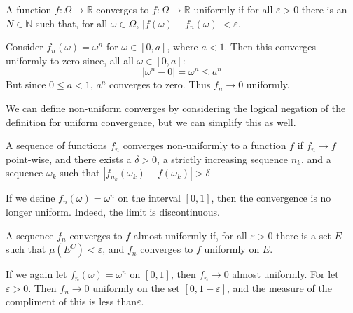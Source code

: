 \documentclass[crop=false,class=book,oneside]{standalone}                      %
\begin{document}
        \begin{definition}
            A function $f:\Omega\rightarrow\mathbb{R}$
            converges to $f:\Omega\rightarrow\mathbb{R}$
            uniformly if for all $\varepsilon>0$ there is
            an $N\in\mathbb{N}$ such that, for all
            $\omega\in\Omega$,
            $|f(\omega)-f_{n}(\omega)|<\varepsilon$.
        \end{definition}
        \begin{example}
            Consider $f_{n}(\omega)=\omega^{n}$ for
            $\omega\in[0,a]$, where $a<1$. Then this
            converges uniformly to zero since, all all
            $\omega\in[0,a]$:
            \begin{equation}
                |\omega^{n}-0|=\omega^{n}\leq{a}^{n}
            \end{equation}
            But since $0\leq{a}<1$, $a^{n}$ converges to
            zero. Thus $f_{n}\rightarrow{0}$ uniformly.
        \end{example}
        We can define non-uniform converges by considering
        the logical negation of the definition for
        uniform convergence, but we can simplify this as
        well.
        \begin{theorem}
            A sequence of functions $f_{n}$ converges
            non-uniformly to a function $f$ if
            $f_{n}\rightarrow{f}$ point-wise, and there
            exists a $\delta>0$, a strictly increasing
            sequence $n_{k}$, and a sequence $\omega_{k}$
            such that
            $|f_{n_{k}}(\omega_{k})-f(\omega_{k})|>\delta$
        \end{theorem}
        \begin{example}
            If we define $f_{n}(\omega)=\omega^{n}$ on the
            interval $[0,1]$, then the convergence is no
            longer uniform. Indeed, the limit is
            discontinuous.
        \end{example}
        \begin{definition}
            A sequence $f_{n}$ converges to $f$ almost
            uniformly if, for all $\varepsilon>0$ there is
            a set $E$ such that $\mu(E^{C})<\varepsilon$,
            and $f_{n}$ converges to $f$ uniformly on
            $E$.
        \end{definition}
        \begin{example}
            If we again let $f_{n}(\omega)=\omega^{n}$ on
            $[0,1]$, then $f_{n}\rightarrow{0}$
            almost uniformly. For let $\varepsilon>0$. Then
            $f_{n}\rightarrow{0}$ uniformly on the set
            $[0,1-\varepsilon]$, and the measure of the
            compliment of this is less than$ \varepsilon$.
        \end{example}
\end{document}
